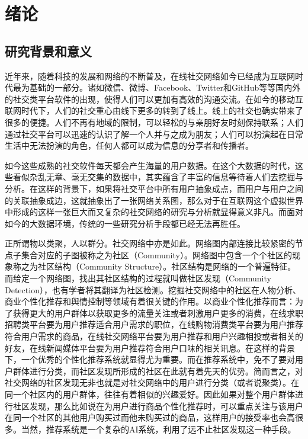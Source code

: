 \chapter{绪论}
\section{研究背景和意义}
近年来，随着科技的发展和网络的不断普及，在线社交网络如今已经成为互联网时代最为基础的一部分。诸如微信、微博、Facebook、Twitter和GitHub等等国内外的社交类平台软件的出现，使得人们可以更加有高效的沟通交流。在如今的移动互联网时代下，人们的社交重心由线下更多的转到了线上。线上的社交也确实带来了很多的便捷。人们不再有地域的限制，可以轻松的与亲朋好友时刻保持联系；人们通过社交平台可以迅速的认识了解一个人并与之成为朋友；人们可以扮演起在日常生活中无法扮演的角色，任何人都可以成为信息的分享者和传播者。

如今这些成熟的社交软件每天都会产生海量的用户数据。在这个大数据的时代，这些看似杂乱无章、毫无交集的数据中，其实蕴含了丰富的信息等待着人们去挖掘与分析。在这样的背景下，如果将社交平台中所有用户抽象成点，而用户与用户之间的关联抽象成边，这就抽象出了一张网络关系图，那么对于在互联网这个虚拟世界中形成的这样一张巨大而又复杂的社交网络的研究与分析就显得意义非凡。而面对如今的大数据环境，传统的一些研究分析手段都已经无法再胜任。

正所谓物以类聚，人以群分。社交网络中亦是如此。网络图内部连接比较紧密的节点子集合对应的子图被称之为社区（Community）。网络图中包含一个个社区的现象称之为社区结构（Community Structure）。社区结构是网络的一个普遍特征。而给定一个网络图，找出其社区结构的过程就叫做社区发现（Community Detection），也有学者将其翻译为社区检测。挖掘社交网络中的社区在人物分析、商业个性化推荐和舆情控制等领域有着很关键的作用。以商业个性化推荐而言：为了获得更大的用户群体以获取更多的流量关注或者刺激用户更多的消费，在线求职招聘类平台要为用户推荐适合用户需求的职位，在线购物消费类平台要为用户推荐符合用户需求的商品，在线社交网络平台要为用户推荐和用户兴趣相投或者相关的好友，在线新闻媒体平台要为用户推荐符合用户口味的相关讯息。在这样的背景下，一个优秀的个性化推荐系统就显得尤为重要。而在推荐系统中，免不了要对用户群体进行分类，而社区发现所形成的社区在此就有着先天的优势。简而言之，对社交网络的社区发现无非也就是对社交网络中的用户进行分类（或者说聚类）。在同一个社区内的用户群体，往往有着相似的兴趣爱好。因此如果对整个用户群体进行社区发现，那么比如说在为用户进行商品个性化推荐时，可以重点关注与该用户在同一个社区的其他用户购买过而他未购买过的商品，这样用户的接受率也会高很多。当然，推荐系统是一个复杂的AI系统，利用了远不止社区发现这一种手段。

